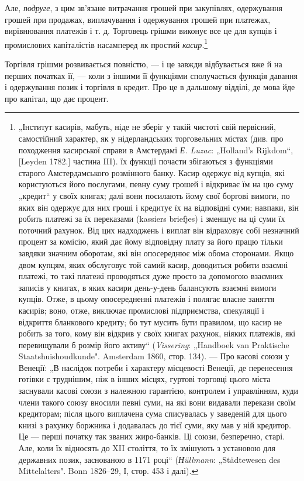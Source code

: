 Але, \emph{подруге}, з цим зв’язане витрачання грошей при закупівлях,
одержування грошей при продажах, виплачування і одержування
грошей при платежах, вирівнювання платежів і т. д.
Торговець грішми виконує все це для купців і промислових
капіталістів насамперед як простий \emph{касир}.\footnote{
„Інститут касирів, мабуть, ніде не зберіг у такій чистоті свій первісний,
самостійний характер, як у нідерландських торговельних містах (див. про
походження касирської справи в Амстердамі \emph{Е. Luzac}: „Holland’s Rijkdom“,
[Leyden 1782.] частина III). їх функції почасти збігаються з функціями старого
Амстердамського розмінного банку. Касир одержує від купців, які користуються
його послугами, певну суму грошей і відкриває їм на цю суму „кредит“
у своїх книгах; далі вони посилають йому свої боргові вимоги, по яких він
одержує для них гроші і кредитує їх на відповідні суми; навпаки, він робить
платежі за їх переказами (kassiers briefjes) і зменшує на ці суми їх поточний
рахунок. Від цих надходжень і виплат він відраховує собі незначний процент
за комісію, який дає йому відповідну плату за його працю тільки завдяки
значним оборотам, які він опосереднює між обома сторонами. Якщо двом купцям,
яких обслуговує той самий касир, доводиться робити взаємні платежі, то
такі платежі проводяться дуже просто за допомогою взаємних записів у книгах,
в яких касири день-у-день балансують взаємні вимоги купців. Отже, в цьому
опосередненні платежів і полягає власне заняття касирів; воно, отже, виключає
промислові підприємства, спекуляції і відкриття бланкового кредиту; бо тут
мусить бути правилом, що касир не робить за того, кому він відкрив у своїх
книгах рахунок, ніяких платежів, які перевищували б розмір його активу“
(\emph{Vissering}: „Handboek van Praktische Staatshuishoudkunde". Amsterdam 1860,
стор. 134). — Про касові союзи у Венеції: „В наслідок потреби і характеру
місцевості Венеції, де перенесення готівки є труднішим, ніж в інших місцях,
гуртові торговці цього міста заснували касові союзи з належною гарантією,
контролем і управлінням, куди члени такого союзу вносили певні суми, на
які вони видавали перекази своїм кредиторам; після цього виплачена сума
списувалась у заведеній для цього книзі з рахунку боржника і додавалась до
тієї суми, яку мав у ній кредитор. Це — перші початку так званих жиро-банків.
Ці союзи, безперечно, старі. Але, коли їх відносять до XII століття, то їх
змішують з установою для державних позик, заснованою в 1171 році“ (\emph{Нüllmann}:
„Städtewesen des Mittelalters". Bonn 1826--29, І, стор. 453 і далі).
}

Торгівля грішми розвивається повністю, — і це завжди відбувається
вже й на перших початках її, — коли з іншими її функціями
сполучається функція давання і одержування позик і торгівля
в кредит. Про це в дальшому відділі, де мова йде про капітал,
що дає процент.
